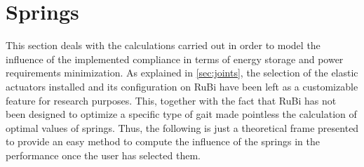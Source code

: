 
\section{Springs}
\label{sec_springs}
This section deals with the calculations carried out in order to model the influence of the implemented compliance in terms of energy storage and power requirements minimization.
As explained in \ref{sec:joints}, the selection of the elastic actuators installed and its configuration on RuBi have been left as a customizable feature for research purposes.
This, together with the fact that RuBi has not been designed to optimize a specific type of gait made pointless the calculation of optimal values of springs.
Thus, the following is just a theoretical frame presented to provide an easy method to compute the influence of the springs in the performance once the user has selected them.




